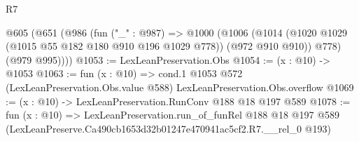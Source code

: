 \begin{lexlean}{R7}
\begin{coremodule}
  @605
    (@651
      (@986
        (fun ("_" : @987) =>
        @1000
          (@1006
            (@1014 (@1020 @1029 (@1015 @55 @182 @180 @910 @196 @1029 @778)) (@972 @910 @910))
            @778)
          (@979 @995))))
@1053 := LexLeanPreservation.Obs
@1054 := (x : @10) -> @1053
@1063 := fun (x : @10) =>
  cond.{1} @1053 @572 (LexLeanPreservation.Obs.value @588) LexLeanPreservation.Obs.overflow
@1069 := (x : @10) -> LexLeanPreservation.RunConv @188 @18 @197 @589
@1078 := fun (x : @10) =>
  LexLeanPreservation.run_of_funRel
    @188
    @18
    @197
    @589
    (LexLeanPreserve.Ca490cb1653d32b01247e470941ac5cf2.R7.__rel_0 @193)
\end{coremodule}
\end{lexlean}
